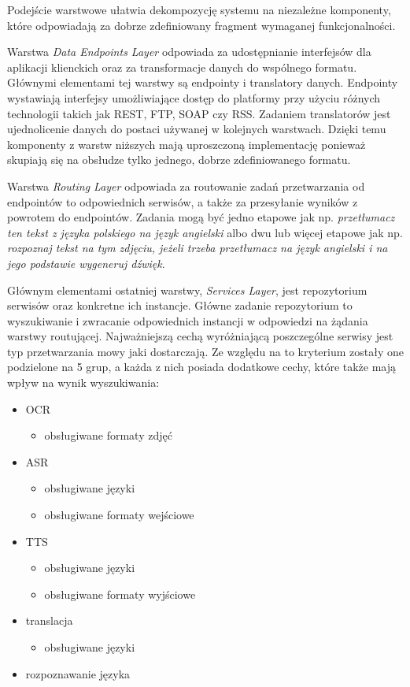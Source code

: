 Podejście warstwowe ułatwia dekompozycję systemu na niezależne komponenty, które odpowiadają za dobrze zdefiniowany fragment wymaganej funkcjonalności. 

Warstwa \textit{Data Endpoints Layer} odpowiada za udostępnianie interfejsów dla aplikacji klienckich oraz za transformacje danych do wspólnego formatu. Głównymi elementami tej warstwy są endpointy i translatory danych. Endpointy wystawiają interfejsy umożliwiające dostęp do platformy przy użyciu różnych technologii takich jak REST, FTP, SOAP czy RSS. Zadaniem translatorów jest ujednolicenie danych do postaci używanej w kolejnych warstwach. Dzięki temu komponenty z warstw niższych mają uproszczoną implementację ponieważ skupiają się na obsłudze tylko jednego, dobrze zdefiniowanego formatu. 

Warstwa \textit{Routing Layer} odpowiada za routowanie zadań przetwarzania od endpointów to odpowiednich serwisów, a także za przesyłanie wyników z powrotem do endpointów. Zadania mogą być jedno etapowe jak np. \textit{przetłumacz ten tekst z języka polskiego na język angielski} albo dwu lub więcej etapowe jak np. \textit{rozpoznaj tekst na tym zdjęciu, jeżeli trzeba przetłumacz na język angielski i na jego podstawie wygeneruj dźwięk}.

Głównym elementami ostatniej warstwy, \textit{Services Layer}, jest repozytorium serwisów oraz konkretne ich instancje. Główne zadanie repozytorium to wyszukiwanie i zwracanie odpowiednich instancji w odpowiedzi na żądania warstwy routującej. Najważniejszą cechą wyróżniającą poszczególne serwisy jest typ przetwarzania mowy jaki dostarczają. Ze względu na to kryterium zostały one podzielone na 5 grup, a każda z nich posiada dodatkowe cechy, które także mają wpływ na wynik wyszukiwania:

\begin{itemize}
	\item OCR
	\begin{itemize}
		\item obsługiwane formaty zdjęć
	\end{itemize}
	\item ASR
	\begin{itemize}
		\item obsługiwane języki 
		\item obsługiwane formaty wejściowe
	\end{itemize}
	\item TTS
	\begin{itemize}
		\item obsługiwane języki 
		\item obsługiwane formaty wyjściowe
	\end{itemize}
	\item translacja
	\begin{itemize}
		\item obsługiwane języki
	\end{itemize}
	\item rozpoznawanie języka
\end{itemize}

